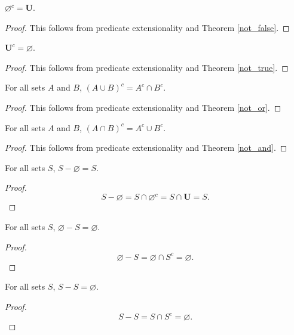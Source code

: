 \documentclass[../../math.tex]{subfiles}
\begin{document}
\begin{theorem} \label{compl_empty}
    $\varnothing^c = \bm U$.
\end{theorem}
\begin{proof}
    This follows from predicate extensionality and Theorem \ref{not_false}.
\end{proof}

\begin{theorem} \label{compl_all}
    $\bm U^c = \varnothing$.
\end{theorem}
\begin{proof}
    This follows from predicate extensionality and Theorem \ref{not_true}.
\end{proof}

\begin{theorem} \label{union_compl}
    For all sets $A$ and $B$, $(A \cup B)^c = A^c \cap B^c$.
\end{theorem}
\begin{proof}
    This follows from predicate extensionality and Theorem \ref{not_or}.
\end{proof}

\begin{theorem} \label{inter_compl}
    For all sets $A$ and $B$, $(A \cap B)^c = A^c \cup B^c$.
\end{theorem}
\begin{proof}
    This follows from predicate extensionality and Theorem \ref{not_and}.
\end{proof}

\begin{theorem}
    For all sets $S$, $S - \varnothing = S$.
\end{theorem}
\begin{proof}
    \[
        S - \varnothing = S \cap \varnothing^c = S \cap \bm U = S.
    \]
\end{proof}

\begin{theorem}
    For all sets $S$, $\varnothing - S = \varnothing$.
\end{theorem}
\begin{proof}
    \[
        \varnothing - S = \varnothing \cap S^c = \varnothing.
    \]
\end{proof}

\begin{theorem}
    For all sets $S$, $S - S = \varnothing$.
\end{theorem}
\begin{proof}
    \[
        S - S = S \cap S^c = \varnothing.
    \]
\end{proof}
\end{document}
